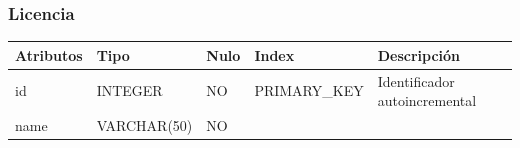 \documentclass[12pt,a4paperpaper,]{report}
\begin{document}
\subsubsection{Licencia}\label{licencia}

\begin{longtable}[]{@{}lllll@{}}
\toprule
\begin{minipage}[b]{0.21\columnwidth}\raggedright\strut
Atributos\strut
\end{minipage} & \begin{minipage}[b]{0.19\columnwidth}\raggedright\strut
Tipo\strut
\end{minipage} & \begin{minipage}[b]{0.16\columnwidth}\raggedright\strut
Nulo\strut
\end{minipage} & \begin{minipage}[b]{0.19\columnwidth}\raggedright\strut
Index\strut
\end{minipage} & \begin{minipage}[b]{0.11\columnwidth}\raggedright\strut
Descripción\strut
\end{minipage}\tabularnewline
\midrule
\endhead
\begin{minipage}[t]{0.21\columnwidth}\raggedright\strut
id\strut
\end{minipage} & \begin{minipage}[t]{0.19\columnwidth}\raggedright\strut
INTEGER\strut
\end{minipage} & \begin{minipage}[t]{0.16\columnwidth}\raggedright\strut
NO\strut
\end{minipage} & \begin{minipage}[t]{0.19\columnwidth}\raggedright\strut
PRIMARY\_KEY\strut
\end{minipage} & \begin{minipage}[t]{0.11\columnwidth}\raggedright\strut
Identificador autoincremental\strut
\end{minipage}\tabularnewline
\begin{minipage}[t]{0.21\columnwidth}\raggedright\strut
name\strut
\end{minipage} & \begin{minipage}[t]{0.19\columnwidth}\raggedright\strut
VARCHAR(50)\strut
\end{minipage} & \begin{minipage}[t]{0.16\columnwidth}\raggedright\strut
NO\strut
\end{minipage} & \begin{minipage}[t]{0.19\columnwidth}\raggedright\strut

\end{minipage}
\end{longtable}
\end{document}
